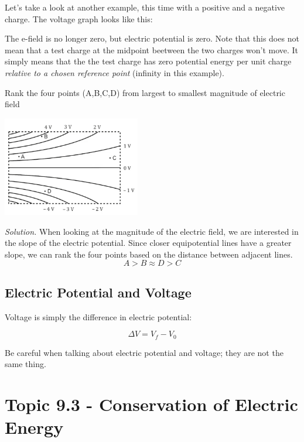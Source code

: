 \documentclass[12pt, titlepage]{article}
\begin{document}
\newpage 

Let's take a look at another example, this time with a positive and a negative charge. The voltage graph looks like this:

\begin{center}
\end{center}

The e-field is no longer zero, but electric potential is zero. Note that this does not mean that a test charge at the midpoint beetween the two charges won't move. It simply means that the the test charge has zero potential energy per unit charge \textit{relative to a chosen reference point} (infinity in this example).

\begin{Problem}
    Rank the four points (A,B,C,D) from largest to smallest magnitude of electric field 
    \begin{center}
        \includegraphics[width=6cm]{Example.png}
    \end{center}

    \tcblower

    \textit{Solution.} When looking at the magnitude of the electric field, we are interested in the slope of the electric potential. Since closer equipotential lines have a greater slope, we can rank the four points based on the distance between adjacent lines. 
    \[A > B \approx D > C\]
\end{Problem}

\subsection*{Electric Potential and Voltage}

Voltage is simply the difference in electric potential:

\[\Delta V = V_f - V_0\]

Be careful when talking about electric potential and voltage; they are not the same thing.

\section*{Topic 9.3 - Conservation of Electric Energy}
\end{document}
